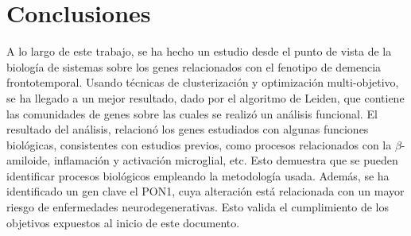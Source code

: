 \section{Conclusiones}

A lo largo de este trabajo, se ha hecho un estudio desde el punto de vista de la biología de sistemas sobre los genes relacionados con el fenotipo de demencia frontotemporal. Usando técnicas de clusterización y optimización multi-objetivo, se ha llegado a un mejor resultado, dado por el algoritmo de Leiden, que contiene las comunidades de genes sobre las cuales se realizó un análisis funcional. El resultado del análisis, relacionó los genes estudiados con algunas funciones biológicas, consistentes con estudios previos, como procesos relacionados con la $\beta$-amiloide, inflamación y activación microglial, etc. Esto demuestra que se pueden identificar procesos biológicos empleando la metodología usada. Además, se ha identificado un gen clave el PON1, cuya alteración está relacionada con un mayor riesgo de enfermedades neurodegenerativas. Esto valida el cumplimiento de los objetivos expuestos al inicio de este documento.
